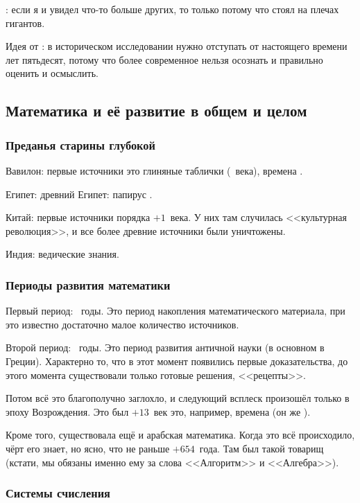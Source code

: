 \documentclass[a4paper,oneside,fleqn,10pt]{article}
\begin{document}
: если я и увидел что-то больше других, то только потому что стоял на
плечах гигантов.

Идея от : в историческом исследовании нужно отступать от настоящего
времени лет пятьдесят, потому что более современное нельзя
осознать и правильно оценить и осмыслить.

\subsection{Математика и её развитие в общем и целом}

\subsubsection{Преданья старины глубокой}

Вавилон: первые источники это глиняные таблички (~века), времена .

Египет: древний Египет: папирус .

Китай: первые источники порядка $+1$~века. У них там случилась
<<культурная революция>>, и все более древние источники были уничтожены.

Индия: ведические знания.

\subsubsection{Периоды развития математики}

Первый период: ~годы. Это период накопления математического
материала, при это известно достаточно малое количество источников.

Второй период: ~годы.
Это период развития античной науки (в основном в Греции).
Характерно то, что в этот момент появились первые  доказательства,
до этого момента существовали только готовые решения, <<рецепты>>.

Потом всё это благополучно заглохло,
и следующий всплеск произошёл только в эпоху Возрождения.
Это был $+13$~век это, например, времена  (он же ).

Кроме того, существовала ещё и арабская математика.
Когда это всё происходило, чёрт  его знает,
но ясно, что не раньше $+654$~года.
Там был такой товарищ  (кстати, мы обязаны
именно ему за слова <<Алгоритм>> и <<Алгебра>>).

\subsubsection{Системы счисления}
\end{document}
